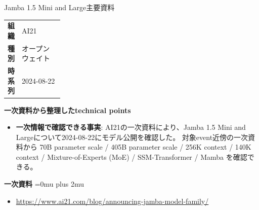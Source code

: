 \begin{technicalnote}{Jamba 1.5 Mini and Large}{主要資料}
\begingroup
\begin{tabularx}{\linewidth}{@{}>{\bfseries}p{0.22\linewidth}X@{}}
組織 & AI21 \\
種別 & オープンウェイト \\
時系列 & 2024-08-22 \\
\end{tabularx}
\smallskip
{\bfseries 一次資料から整理したtechnical points}
\begin{itemize}[leftmargin=1.5em,itemsep=0.35em]
\item \textbf{一次情報で確認できる事実}: AI21の一次資料により、Jamba 1.5 Mini and Largeについて2024-08-22にモデル公開を確認した。 対象event近傍の一次資料から 70B parameter scale / 405B parameter scale / 256K context / 140K context / Mixture-of-Experts (MoE) / SSM-Transformer / Mamba を確認できる。
\end{itemize}
\begin{minipage}{\linewidth}
\begin{samepage}
{\bfseries 一次資料}
\begingroup\sloppy
\Urlmuskip=0mu plus 2mu\relax
\begin{itemize}[leftmargin=1.5em,itemsep=0.25em]
\item {\scriptsize\url{https://www.ai21.com/blog/announcing-jamba-model-family/}}
\end{itemize}
\endgroup
\end{samepage}
\end{minipage}
\endgroup
\end{technicalnote}
\medskip

